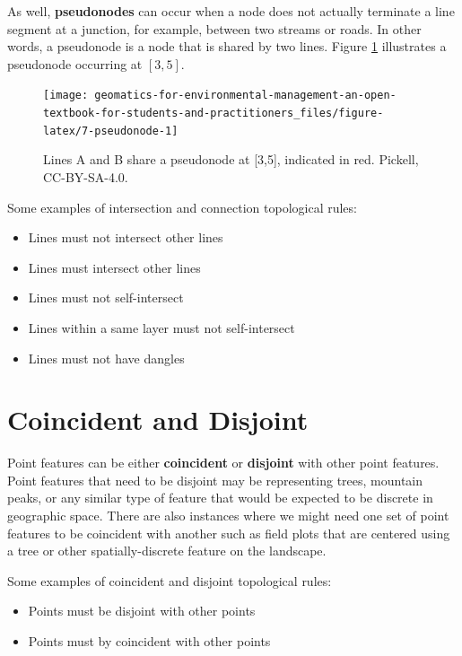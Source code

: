 \documentclass[
]{book}
\providecommand{\tightlist}{%
  \setlength{\itemsep}{0pt}\setlength{\parskip}{0pt}}
\begin{document}
As well, \textbf{pseudonodes} can occur when a node does not actually terminate a line segment at a junction, for example, between two streams or roads. In other words, a pseudonode is a node that is shared by two lines. Figure \ref{fig:7-pseudonode} illustrates a pseudonode occurring at \([3,5]\).

\begin{figure}

{\centering \texttt{[image: geomatics-for-environmental-management-an-open-textbook-for-students-and-practitioners\_files/figure-latex/7-pseudonode-1]} 

}

\caption{Lines A and B share a pseudonode at [3,5], indicated in red. Pickell, CC-BY-SA-4.0.}\label{fig:7-pseudonode}
\end{figure}

Some examples of intersection and connection topological rules:

\begin{itemize}
\tightlist
\item
  Lines must not intersect other lines
\item
  Lines must intersect other lines
\item
  Lines must not self-intersect
\item
  Lines within a same layer must not self-intersect
\item
  Lines must not have dangles
\end{itemize}

\section{Coincident and Disjoint}\label{coincident-and-disjoint}

Point features can be either \textbf{coincident} or \textbf{disjoint} with other point features. Point features that need to be disjoint may be representing trees, mountain peaks, or any similar type of feature that would be expected to be discrete in geographic space. There are also instances where we might need one set of point features to be coincident with another such as field plots that are centered using a tree or other spatially-discrete feature on the landscape.

Some examples of coincident and disjoint topological rules:

\begin{itemize}
\tightlist
\item
  Points must be disjoint with other points
\item
  Points must by coincident with other points
\end{itemize}
\end{document}
